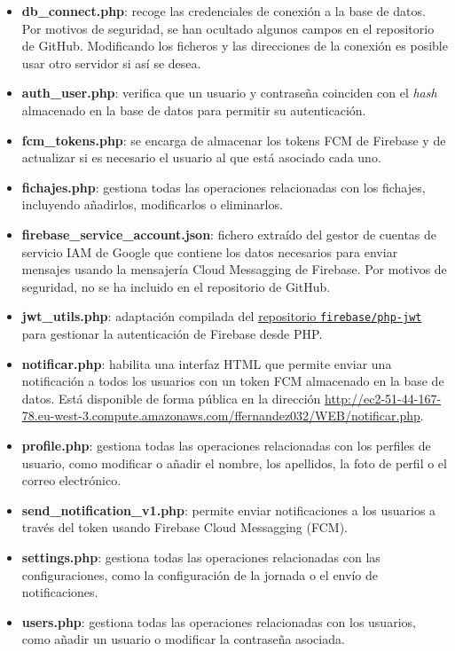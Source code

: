\begin{itemize}
  \item \textbf{db\_connect.php}: recoge las credenciales de conexión a la base de datos. Por motivos de seguridad, se han ocultado algunos campos en el repositorio de GitHub. Modificando los ficheros y las direcciones de la conexión es posible usar otro servidor si así se desea.
  \item \textbf{auth\_user.php}: verifica que un usuario y contraseña coinciden con el \textit{hash} almacenado en la base de datos para permitir su autenticación.
  \item \textbf{fcm\_tokens.php}: se encarga de almacenar los tokens FCM de Firebase y de actualizar si es necesario el usuario al que está asociado cada uno.
  \item \textbf{fichajes.php}: gestiona todas las operaciones relacionadas con los fichajes, incluyendo añadirlos, modificarlos o eliminarlos.
  \item \textbf{firebase\_service\_account.json}: fichero extraído del gestor de cuentas de servicio IAM de Google que contiene los datos necesarios para enviar mensajes usando la mensajería Cloud Messagging de Firebase. Por motivos de seguridad, no se ha incluido en el repositorio de GitHub.
  \item \textbf{jwt\_utils.php}: adaptación compilada del \href{https://github.com/firebase/php-jwt}{repositorio \texttt{firebase/php-jwt}} para gestionar la autenticación de Firebase desde PHP.
  \item \textbf{notificar.php}: habilita una interfaz HTML que permite enviar una notificación a todos los usuarios con un token FCM almacenado en la base de datos. Está disponible de forma pública en la dirección \url{http://ec2-51-44-167-78.eu-west-3.compute.amazonaws.com/ffernandez032/WEB/notificar.php}.
  \item \textbf{profile.php}: gestiona todas las operaciones relacionadas con los perfiles de usuario, como modificar o añadir el nombre, los apellidos, la foto de perfil o el correo electrónico.
  \item \textbf{send\_notification\_v1.php}: permite enviar notificaciones a los usuarios a través del token usando Firebase Cloud Messagging (FCM).
  \item \textbf{settings.php}: gestiona todas las operaciones relacionadas con las configuraciones, como la configuración de la jornada o el envío de notificaciones.
  \item \textbf{users.php}: gestiona todas las operaciones relacionadas con los usuarios, como añadir un usuario o modificar la contraseña asociada.
\end{itemize}